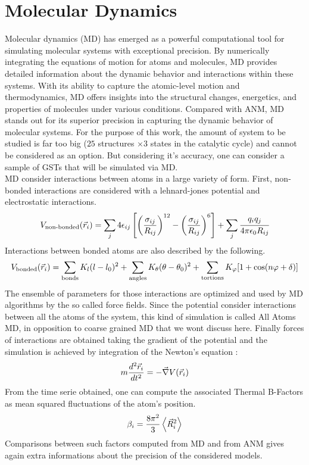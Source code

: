 \section{Molecular Dynamics}
Molecular dynamics (MD) has emerged as a powerful computational tool for simulating molecular systems with exceptional precision. By numerically integrating the equations of motion for atoms and molecules, MD provides detailed information about the dynamic behavior and interactions within these systems. With its ability to capture the atomic-level motion and thermodynamics, MD offers insights into the structural changes, energetics, and properties of molecules under various conditions. Compared with ANM, MD stands out for its superior precision in capturing the dynamic behavior of molecular systems. For the purpose of this work, the amount of system to be studied is far too big ($25$ structures $\times 3$ states in the catalytic cycle) and cannot be considered as an option. But considering it's accuracy, one can consider a sample of GSTs that will be simulated via MD.\\
MD consider interactions between atoms in a large variety of form. First, non-bonded interactions are considered with a lehnard-jones potential and electrostatic interactions.
\begin{equation}
	\label{non-bonded}
	V_{\text{non-bonded}}(\vec{r}_i) = \sum_j 4\epsilon_{ij}\left[ \left( \frac{\sigma_{ij}}{R_{ij}} \right)^{12} - \left( \frac{\sigma_{ij}}{R_{ij}} \right)^{6} \right] + \sum_j\cfrac{q_iq_j}{4\pi\epsilon_0R_{ij}}
\end{equation}
Interactions between bonded atoms are also described by the following.
\begin{equation}
	\label{bonded}
	V_{\text{bonded}}(\vec{r}_i) = \sum_{\text{bonds}} K_l(l - l_0)^2 + \sum_{\text{angles}} K_\theta(\theta - \theta_0)^2 + \sum_{\text{tortions}} K_\varphi [1 + \cos (n\varphi + \delta)]
\end{equation}
The ensemble of parameters for those interactions are optimized and used by MD algorithms by the so called force fields. Since the potential consider interactions between all the atoms of the system, this kind of simulation is called All Atoms MD, in opposition to coarse grained MD that we wont discuss here. Finally forces of interactions are obtained taking the gradient of the potential and the simulation is achieved by integration of the Newton's equation :
\begin{equation}
	\label{Newton}
	m\frac{d^2\vec{r}_i}{dt^2} = -\vec{\nabla}V(\vec{r}_i)
\end{equation}
From the time serie obtained, one can compute the associated Thermal B-Factors as mean squared fluctuations of the atom's position.
\begin{equation}
	\label{MD thermal B-factors}
	\beta_i = \frac{8\pi^2}{3}\left< \vec{R}_i^2 \right>
\end{equation}
Comparisons between such factors computed from MD and from ANM gives again extra informations about the precision of the considered models.